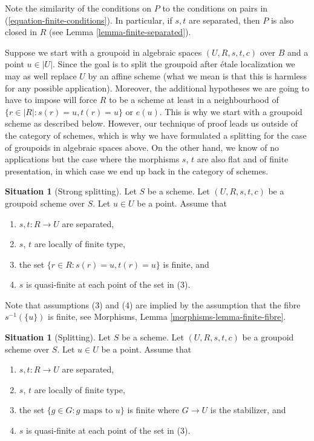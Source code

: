 \documentclass{stacks-project}
\theoremstyle{plain}
\theoremstyle{definition}
\newtheorem{situation}[subsection]{Situation}
\theoremstyle{remark}
\numberwithin{equation}{subsection}
\begin{document}
\noindent
Note the similarity of the conditions on $P$ to the conditions on
pairs in (\ref{equation-finite-conditions}). In particular, if
$s, t$ are separated, then $P$ is also closed in $R$ (see
Lemma \ref{lemma-finite-separated}).

\medskip\noindent
Suppose we start with a groupoid in algebraic spaces
$(U, R, s, t, c)$ over $B$ and a point $u \in |U|$.
Since the goal is to split the groupoid after \'etale localization
we may as well replace $U$ by an affine scheme (what we mean
is that this is harmless for any possible application).
Moreover, the additional hypotheses we are going to have
to impose will force $R$ to be a scheme at least in a neighbourhood
of $\{r \in |R| : s(r) = u, t(r) = u\}$ or $e(u)$. This is why
we start with a groupoid scheme as described below.
However, our technique of proof leads us outside of the category of schemes,
which is why we have formulated a splitting for the case of groupoids
in algebraic spaces above.
On the other hand, we know of no applications but
the case where the morphisms $s$, $t$
are also flat and of finite presentation, in which case
we end up back in the category of schemes.

\begin{situation}[Strong splitting]
\label{situation-strong-splitting}
Let $S$ be a scheme.
Let $(U, R, s, t, c)$ be a groupoid scheme over $S$.
Let $u \in U$ be a point. Assume that
\begin{enumerate}
\item $s, t : R \to U$ are separated,
\item $s$, $t$ are locally of finite type,
\item the set $\{r \in R : s(r) = u, t(r) = u\}$ is finite, and
\item $s$ is quasi-finite at each point of the set in (3).
\end{enumerate}
Note that assumptions (3) and (4) are implied by the assumption
that the fibre $s^{-1}(\{u\})$ is finite, see
Morphisms, Lemma \ref{morphisms-lemma-finite-fibre}.
\end{situation}

\begin{situation}[Splitting]
\label{situation-splitting}
Let $S$ be a scheme.
Let $(U, R, s, t, c)$ be a groupoid scheme over $S$.
Let $u \in U$ be a point. Assume that
\begin{enumerate}
\item $s, t : R \to U$ are separated,
\item $s$, $t$ are locally of finite type,
\item the set $\{g \in G : g\text{ maps to }u\}$ is finite where $G \to U$
is the stabilizer, and
\item $s$ is quasi-finite at each point of the set in (3).
\end{enumerate}
\end{situation}
\end{document}
